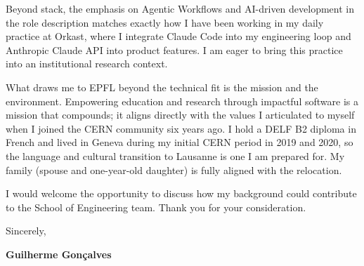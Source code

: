 \documentclass[11pt,a4paper]{article}
\begin{document}
Beyond stack, the emphasis on Agentic Workflows and AI-driven development in the role description matches exactly how I have been working in my daily practice at Orkast, where I integrate Claude Code into my engineering loop and Anthropic Claude API into product features. I am eager to bring this practice into an institutional research context.

What draws me to EPFL beyond the technical fit is the mission and the environment. Empowering education and research through impactful software is a mission that compounds; it aligns directly with the values I articulated to myself when I joined the CERN community six years ago. I hold a DELF B2 diploma in French and lived in Geneva during my initial CERN period in 2019 and 2020, so the language and cultural transition to Lausanne is one I am prepared for. My family (spouse and one-year-old daughter) is fully aligned with the relocation.

I would welcome the opportunity to discuss how my background could contribute to the School of Engineering team. Thank you for your consideration.

\vspace{1em}

\closing{Sincerely,}

\vspace{2em}

\textbf{Guilherme Gonçalves}
\end{document}
